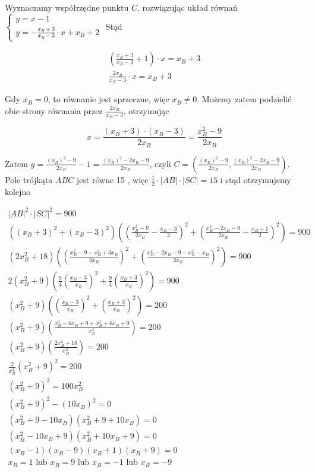 \documentclass[10pt]{article}
\begin{document}
Wyznaczamy współrzędne punktu $C$, rozwiązując układ równań $\left\{\begin{array}{l}y=x-1 \\ y=-\frac{x_{B}+3}{x_{B}-3} \cdot x+x_{B}+2\end{array}\right.$ Stąd

$$
\begin{gathered}
\left(\frac{x_{B}+3}{x_{B}-3}+1\right) \cdot x=x_{B}+3 \\
\frac{2 x_{B}}{x_{B}-3} \cdot x=x_{B}+3
\end{gathered}
$$

Gdy $x_{B}=0$, to równanie jest sprzeczne, więc $x_{B} \neq 0$. Możemy zatem podzielić obie strony równania przez $\frac{2 x_{B}}{x_{B}-3}$, otrzymując

$$
x=\frac{\left(x_{B}+3\right) \cdot\left(x_{B}-3\right)}{2 x_{B}}=\frac{x_{B}^{2}-9}{2 x_{B}}
$$

Zatem $y=\frac{\left(x_{B}\right)^{2}-9}{2 x_{B}}-1=\frac{\left(x_{B}\right)^{2}-2 x_{B}-9}{2 x_{B}}$, czyli $C=\left(\frac{\left(x_{B}\right)^{2}-9}{2 x_{B}}, \frac{\left(x_{B}\right)^{2}-2 x_{B}-9}{2 x_{B}}\right)$.\\
Pole trójkąta $A B C$ jest równe 15 , więc $\frac{1}{2} \cdot|A B| \cdot|S C|=15$ i stąd otrzymujemy kolejno

$$
\begin{gathered}
|A B|^{2} \cdot|S C|^{2}=900 \\
\left(\left(x_{B}+3\right)^{2}+\left(x_{B}-3\right)^{2}\right)\left(\left(\frac{x_{B}^{2}-9}{2 x_{B}}-\frac{x_{B}-3}{2}\right)^{2}+\left(\frac{x_{B}^{2}-2 x_{B}-9}{2 x_{B}}-\frac{x_{B}+1}{2}\right)^{2}\right)=900 \\
\left(2 x_{B}^{2}+18\right)\left(\left(\frac{x_{B}^{2}-9-x_{B}^{2}+3 x_{B}}{2 x_{B}}\right)^{2}+\left(\frac{x_{B}^{2}-2 x_{B}-9-x_{B}^{2}-x_{B}}{2 x_{B}}\right)^{2}\right)=900 \\
2\left(x_{B}^{2}+9\right)\left(\frac{9}{4}\left(\frac{x_{B}-3}{x_{B}}\right)^{2}+\frac{9}{4}\left(\frac{x_{B}+3}{x_{B}}\right)^{2}\right)=900 \\
\left(x_{B}^{2}+9\right)\left(\left(\frac{x_{B}-3}{x_{B}}\right)^{2}+\left(\frac{x_{B}+3}{x_{B}}\right)^{2}\right)=200 \\
\left(x_{B}^{2}+9\right)\left(\frac{x_{B}^{2}-6 x_{B}+9+x_{B}^{2}+6 x_{B}+9}{x_{B}^{2}}\right)=200 \\
\left(x_{B}^{2}+9\right)\left(\frac{2 x_{B}^{2}+18}{x_{B}^{2}}\right)=200 \\
\frac{2}{x_{B}^{2}}\left(x_{B}^{2}+9\right)^{2}=200 \\
\left(x_{B}^{2}+9\right)^{2}=100 x_{B}^{2} \\
\left(x_{B}^{2}+9\right)^{2}-\left(10 x_{B}\right)^{2}=0 \\
\left(x_{B}^{2}+9-10 x_{B}\right)\left(x_{B}^{2}+9+10 x_{B}\right)=0 \\
\left(x_{B}^{2}-10 x_{B}+9\right)\left(x_{B}^{2}+10 x_{B}+9\right)=0 \\
\left(x_{B}-1\right)\left(x_{B}-9\right)\left(x_{B}+1\right)\left(x_{B}+9\right)=0 \\
x_{B}=1 \text { lub } x_{B}=9 \text { lub } x_{B}=-1 \text { lub } x_{B}=-9
\end{gathered}
$$
\end{document}
